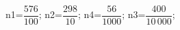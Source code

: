 \documentclass[exercice]{thedocument}%
\begin{document}
%
    \>n1=$\dfrac{576}{100}$;%
    \>n2=$\dfrac{298}{10}$;%
    \>n4=$\dfrac{56}{1000}$;%
    \>n3=$\dfrac{400}{10\,000}$;%
\end{document}
